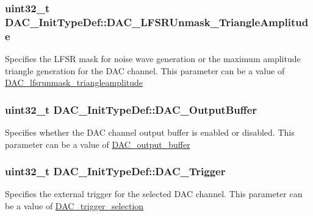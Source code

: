 \subsubsection[{\texorpdfstring{D\+A\+C\+\_\+\+L\+F\+S\+R\+Unmask\+\_\+\+Triangle\+Amplitude}{DAC_LFSRUnmask_TriangleAmplitude}}]{\setlength{\rightskip}{0pt plus 5cm}uint32\+\_\+t D\+A\+C\+\_\+\+Init\+Type\+Def\+::\+D\+A\+C\+\_\+\+L\+F\+S\+R\+Unmask\+\_\+\+Triangle\+Amplitude}\hypertarget{struct_d_a_c___init_type_def_a27ed27a544d50781b20d59cc55e6cef8}{}\label{struct_d_a_c___init_type_def_a27ed27a544d50781b20d59cc55e6cef8}
Specifies the L\+F\+SR mask for noise wave generation or the maximum amplitude triangle generation for the D\+AC channel. This parameter can be a value of \hyperlink{group___d_a_c__lfsrunmask__triangleamplitude}{D\+A\+C\+\_\+lfsrunmask\+\_\+triangleamplitude} 
\subsubsection[{\texorpdfstring{D\+A\+C\+\_\+\+Output\+Buffer}{DAC_OutputBuffer}}]{\setlength{\rightskip}{0pt plus 5cm}uint32\+\_\+t D\+A\+C\+\_\+\+Init\+Type\+Def\+::\+D\+A\+C\+\_\+\+Output\+Buffer}\hypertarget{struct_d_a_c___init_type_def_ad3e9e01486443e99f19e65a446b03ca6}{}\label{struct_d_a_c___init_type_def_ad3e9e01486443e99f19e65a446b03ca6}
Specifies whether the D\+AC channel output buffer is enabled or disabled. This parameter can be a value of \hyperlink{group___d_a_c__output__buffer}{D\+A\+C\+\_\+output\+\_\+buffer} 
\subsubsection[{\texorpdfstring{D\+A\+C\+\_\+\+Trigger}{DAC_Trigger}}]{\setlength{\rightskip}{0pt plus 5cm}uint32\+\_\+t D\+A\+C\+\_\+\+Init\+Type\+Def\+::\+D\+A\+C\+\_\+\+Trigger}\hypertarget{struct_d_a_c___init_type_def_a7b26ebaeb51a0157a781f7de8ba779e5}{}\label{struct_d_a_c___init_type_def_a7b26ebaeb51a0157a781f7de8ba779e5}
Specifies the external trigger for the selected D\+AC channel. This parameter can be a value of \hyperlink{group___d_a_c__trigger__selection}{D\+A\+C\+\_\+trigger\+\_\+selection} 
